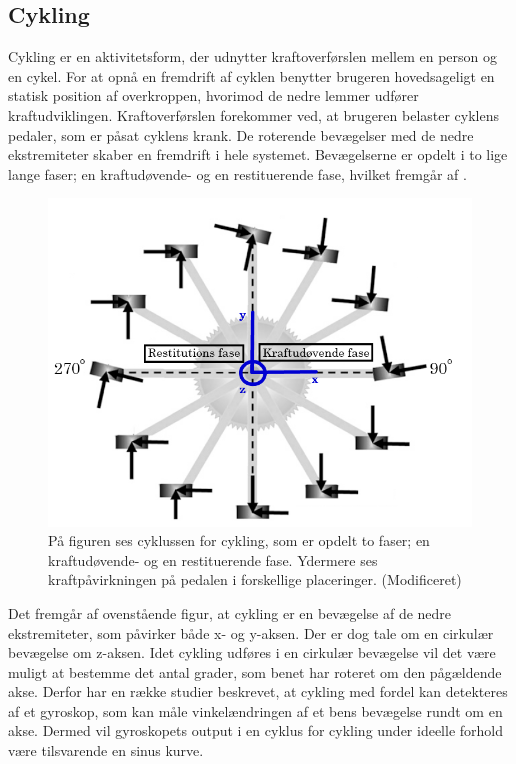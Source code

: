\subsection{Cykling}
Cykling er en aktivitetsform, der udnytter kraftoverførslen mellem en person og en cykel. For at opnå en fremdrift af cyklen benytter brugeren hovedsageligt en statisk position af overkroppen, hvorimod de nedre lemmer udfører kraftudviklingen. \citep{Springer2014} Kraftoverførslen forekommer ved, at brugeren belaster cyklens pedaler, som er påsat cyklens krank. De roterende bevægelser med de nedre ekstremiteter skaber en fremdrift i hele systemet. Bevægelserne er opdelt i to lige lange faser; en kraftudøvende- og en restituerende fase, hvilket fremgår af .
\begin{figure}[H]
	\centering
	\includegraphics[scale=0.45]{figures/bProblemloesning/cykel_cyklus.png}
	\caption{På figuren ses cyklussen for cykling, som er opdelt to faser; en kraftudøvende- og en restituerende fase. Ydermere ses kraftpåvirkningen på pedalen i forskellige placeringer. \citep{Springer2014} (Modificeret)}
	\label{fig:cykel_cyklus}
\end{figure}
Det fremgår af ovenstående figur, at cykling er en bevægelse af de nedre ekstremiteter, som påvirker både x- og y-aksen. Der er dog tale om en cirkulær bevægelse om z-aksen. Idet cykling udføres i en cirkulær bevægelse vil det være muligt at bestemme det antal grader, som benet har roteret om den pågældende akse. Derfor har en række studier beskrevet, at cykling med fordel kan detekteres af et gyroskop, som kan måle vinkelændringen af et bens bevægelse rundt om en akse. Dermed vil gyroskopets output i en cyklus for cykling under ideelle forhold være tilsvarende en sinus kurve. \citep{Cockcroft2011,Marin-PerianuMarin-Perianu2013} 
%
%
%
